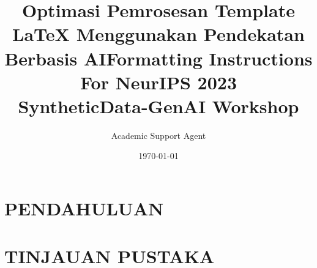 \documentclass{article}
\title{Optimasi Pemrosesan Template LaTeX Menggunakan Pendekatan Berbasis AI}
\author{Academic Support Agent}
\date{\today}
\begin{document}
\maketitle

\begin{abstract}

\end{abstract}

\chapter{PENDAHULUAN}


\chapter{TINJAUAN PUSTAKA}








    \usepackage[nonatbib]{neurips_2023}

\usepackage[utf8]{inputenc} %
\usepackage[T1]{fontenc}    %
\usepackage{hyperref}       %
\usepackage{url}            %
\usepackage{booktabs}       %
\usepackage{amsfonts}       %
\usepackage{nicefrac}       %
\usepackage{microtype}      %
\usepackage{xcolor}         %

\title{Formatting Instructions For NeurIPS 2023 \\ SyntheticData-GenAI Workshop}

%
\end{document}

